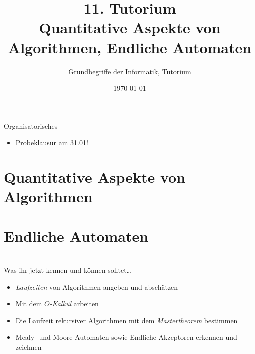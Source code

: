 




\usetikzlibrary{matrix}
\usetikzlibrary{arrows.meta}
\usetikzlibrary{automata}
\usetikzlibrary{tikzmark}

\title[Quantitative Aspekte von Algorithmen, Endliche Automaten]{11. Tutorium\\  Quantitative Aspekte von Algorithmen, Endliche Automaten}
\subtitle{Grundbegriffe der Informatik, Tutorium \hashtag\mytutnumber}
\date{\today}



\titleframe
\roadmap

\begin{frame}{Organisatorisches}
\begin{itemize}
    \item Probeklausur am 31.01!
\end{itemize}
\end{frame}

\section{Quantitative Aspekte von Algorithmen}


\section{Endliche Automaten}


\section{}
	\begin{frame}{Was ihr jetzt kennen und können solltet\dots}
			\begin{itemize}
				\item \emph{Laufzeiten} von Algorithmen angeben und abschätzen
				\item Mit dem \emph{$O$-Kalkül} arbeiten
				\item Die Laufzeit rekursiver Algorithmen mit dem \emph{Mastertheorem} bestimmen
				\item Mealy- und Moore Automaten sowie Endliche Akzeptoren erkennen und zeichnen
			\end{itemize}
	
	\end{frame}
